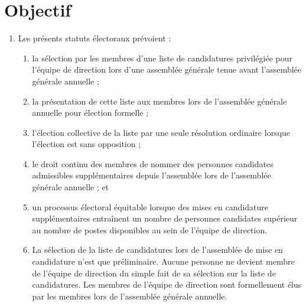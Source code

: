 \section{Objectif}
\label{objectif}

\begin{enumerate}
 \item Les présents statuts électoraux prévoient :
  \begin{enumerate}
   \item la sélection par les membres d'une liste de candidatures privilégiée pour l'équipe de direction lors d'une assemblée générale tenue avant l'assemblée générale annuelle ;
   \item la présentation de cette liste aux membres lors de l'assemblée générale annuelle pour élection formelle ;
   \item l'élection collective de la liste par une seule résolution ordinaire lorsque l'élection est sans opposition ;
   \item le droit continu des membres de nommer des personnes candidates admissibles supplémentaires depuis l'assemblée lors de l'assemblée générale annuelle ; et
   \item un processus électoral équitable lorsque des mises en candidature supplémentaires entraînent un nombre de personnes candidates supérieur au nombre de postes disponibles au sein de l'équipe de direction.
   \item La sélection de la liste de candidatures lors de l'assemblée de mise en candidature n'est que préliminaire. Aucune personne ne devient membre de l'équipe de direction du simple fait de sa sélection sur la liste de candidatures. Les membres de l'équipe de direction sont formellement élus par les membres lors de l'assemblée générale annuelle.
  \end{enumerate}
\end{enumerate}
